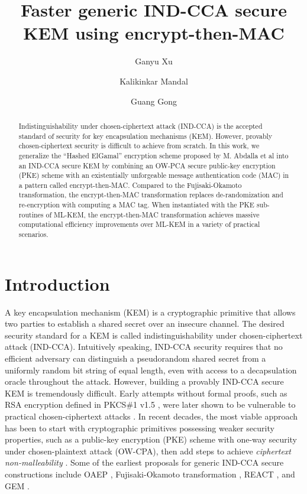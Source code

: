 \documentclass[journal=tches,submission]{iacrtrans}
\author{
    Ganyu Xu\inst{1}
    \and Kalikinkar Mandal\inst{2}
    \and Guang Gong\inst{1}
}
\institute{
  University of Waterloo, Waterloo, Canada, \email{{g66xu,ggong}@uwaterloo.ca}
  \and
  University of New Brunswick, New Brunswick, Canada, \email{kmandal@unb.ca}
}
\title{Faster generic IND-CCA secure KEM using encrypt-then-MAC}
\begin{document}
\maketitle




\begin{abstract}
    Indistinguishability under chosen-ciphertext attack (IND-CCA) is the accepted standard of security for key encapsulation mechanisms (KEM). However, provably chosen-ciphertext security is difficult to achieve from scratch. In this work, we generalize the ``Hashed ElGamal'' encryption scheme proposed by M. Abdalla et al into an IND-CCA secure KEM by combining an OW-PCA secure public-key encryption (PKE) scheme with an existentially unforgeable message authentication code (MAC) in a pattern called encrypt-then-MAC. Compared to the Fujisaki-Okamoto transformation, the encrypt-then-MAC transformation replaces de-randomization and re-encryption with computing a MAC tag. When instantiated with the PKE sub-routines of ML-KEM, the encrypt-then-MAC transformation achieves massive computational efficiency improvements over ML-KEM in a variety of practical scenarios.
\end{abstract}

\section{Introduction}\label{sec:introduction}
A key encapsulation mechanism (KEM) \cite{DBLP:journals/iacr/Shoup01} is a cryptographic primitive that allows two parties to establish a shared secret over an insecure channel. The desired security standard for a KEM is called indistinguishability under chosen-ciphertext attack (IND-CCA). Intuitively speaking, IND-CCA security requires that no efficient adversary can distinguish a pseudorandom shared secret from a uniformly random bit string of equal length, even with access to a decapsulation oracle throughout the attack. However, building a provably IND-CCA secure KEM is tremendously difficult. Early attempts without formal proofs, such as RSA encryption defined in PKCS\#1 v1.5 \cite{DBLP:journals/rfc/rfc2313}, were later shown to be vulnerable to practical chosen-ciphertext attacks \cite{DBLP:conf/crypto/Bleichenbacher98}. In recent decades, the most viable approach has been to start with cryptographic primitives possessing weaker security properties, such as a public-key encryption (PKE) scheme with one-way security under chosen-plaintext attack (OW-CPA), then add steps to achieve \emph{ciphertext non-malleability} \cite{DBLP:conf/asiacrypt/BellareN00}. Some of the earliest proposals for generic IND-CCA secure constructions include OAEP \cite{DBLP:conf/eurocrypt/BellareR94}, Fujisaki-Okamoto transformation \cite{DBLP:conf/crypto/FujisakiO99}\cite{DBLP:journals/joc/FujisakiO13}, REACT \cite{DBLP:conf/ctrsa/OkamotoP01}, and GEM \cite{DBLP:conf/ctrsa/CoronHJPPT02}.
\end{document}
